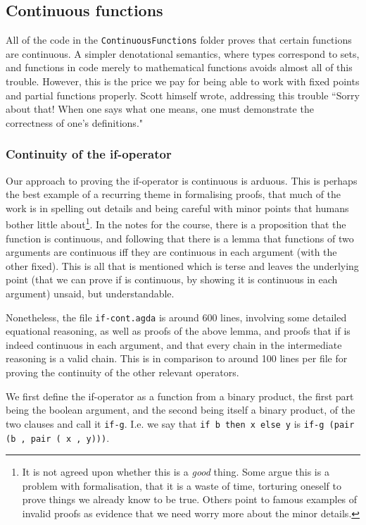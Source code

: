 \documentclass[12pt,a4paper,twoside,openright]{report}
\begin{document}
\subsection{Continuous functions}
All of the code in the \texttt{ContinuousFunctions} folder proves that certain functions are continuous. A simpler denotational semantics, where types correspond to sets, and functions in code merely to mathematical functions avoids almost all of this trouble. However, this is the price we pay for being able to work with fixed points and partial functions properly. Scott himself wrote, addressing this trouble ``Sorry about that! When one says what one means, one must demonstrate the correctness of one’s definitions." 
\subsubsection{Continuity of the if-operator}
Our approach to proving the if-operator is continuous is arduous. This is perhaps the best example of a recurring theme \cite{PLFA} \cite{Dima-Soas} \cite{Ted} in formalising proofs, that much of the work is in spelling out details and being careful with minor points that humans bother little about\footnote{It is not agreed upon whether this is a \textit{good} thing. Some argue this is a problem with formalisation, that it is a waste of time, torturing oneself to prove things we already know to be true. Others point to famous examples of invalid proofs as evidence that we need worry more about the minor details.}. In the notes for the course, there is a proposition that the function is continuous, and following that there is a lemma that functions of two arguments are continuous iff they are continuous in each argument (with the other fixed). This is all that is mentioned which is terse and leaves the underlying point (that we can prove if is continuous, by showing it is continuous in each argument) unsaid, but understandable.

Nonetheless, the file \texttt{if-cont.agda} is around 600 lines, involving some detailed equational reasoning, as well as proofs of the above lemma, and proofs that if is indeed continuous in each argument, and that every chain in the intermediate reasoning is a valid chain. This is in comparison to around 100 lines per file for proving the continuity of the other relevant operators. 

We first define the if-operator as a function from a binary product, the first part being the boolean argument, and the second being itself a binary product, of the two clauses and call it \texttt{if-g}. I.e. we say that \texttt{if b then x else y} is \texttt{if-g (pair (b , pair ( x , y)))}. 
\end{document}
